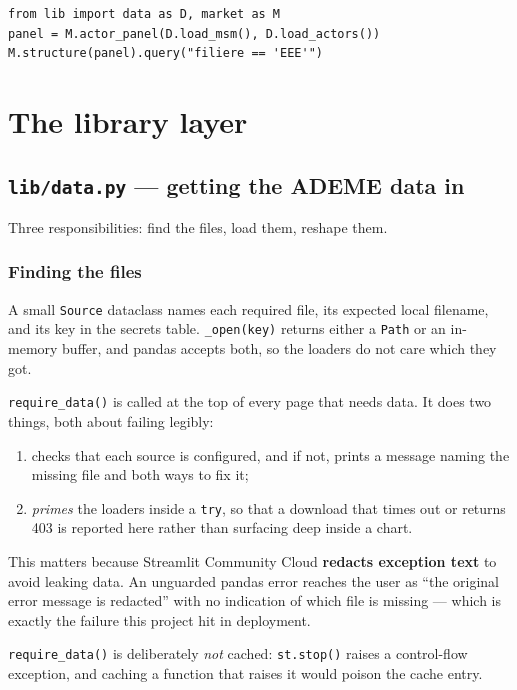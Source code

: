 \documentclass[11pt,a4paper]{article}
\newcommand{\file}[1]{\texttt{#1}}
\begin{document}
\begin{lstlisting}[style=py]
from lib import data as D, market as M
panel = M.actor_panel(D.load_msm(), D.load_actors())
M.structure(panel).query("filiere == 'EEE'")
\end{lstlisting}

\newpage
\section{The library layer}

\subsection{\file{lib/data.py} --- getting the ADEME data in}

Three responsibilities: find the files, load them, reshape them.

\subsubsection*{Finding the files}

A small \file{Source} dataclass names each required file, its expected local
filename, and its key in the secrets table. \file{\_open(key)} returns either a
\file{Path} or an in-memory buffer, and pandas accepts both, so the loaders do
not care which they got.

\file{require\_data()} is called at the top of every page that needs data. It
does two things, both about failing legibly:

\begin{enumerate}
  \item checks that each source is configured, and if not, prints a message
        naming the missing file and both ways to fix it;
  \item \emph{primes} the loaders inside a \file{try}, so that a download that
        times out or returns 403 is reported here rather than surfacing deep
        inside a chart.
\end{enumerate}

This matters because Streamlit Community Cloud \textbf{redacts exception text}
to avoid leaking data. An unguarded pandas error reaches the user as ``the
original error message is redacted'' with no indication of which file is
missing --- which is exactly the failure this project hit in deployment.

\file{require\_data()} is deliberately \emph{not} cached: \file{st.stop()} raises
a control-flow exception, and caching a function that raises it would poison the
cache entry.
\end{document}
